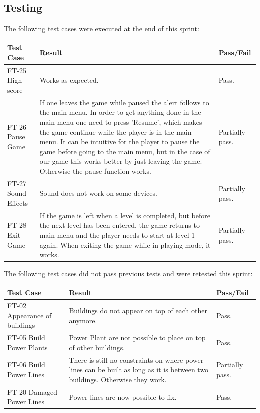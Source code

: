 \subsection{Testing}

	The following test cases were executed at the end of this sprint:


	\begin{tabular}{| p{3cm} | p{7cm} | p{2cm} |}
		\hline
		\rowcolor{lightgray}
		{\bf Test Case} & {\bf Result} & {\bf Pass/Fail} \\ \hline

		FT-25 High score & Works as expected. & Pass. \\ \hline

		FT-26 Pause Game & If one leaves the game while paused the alert follows to the main menu. In order 
		to get anything done in the main menu one need to press 'Resume', which makes the game continue while 
		the player is in the main menu. It can be intuitive for the player to pause the game before going to 
		the main menu, but in the case of our game this works better by just leaving the game. Otherwise the 
		pause function works. & Partially pass. \\ \hline

		FT-27 Sound Effects & Sound does not work on some devices. & Partially pass. \\ \hline

		FT-28 Exit Game & If the game is left when a level is completed, but before the next level has been 
		entered, the game returns to main menu and the player needs to start at level 1 again. When exiting 
		the game while in playing mode, it works. & Partially pass. \\ \hline



	\end{tabular}

	The following test cases did not pass previous tests and were retested this sprint:

	\begin{tabular}{| p{3cm} | p{7cm} | p{2cm} |}
		\hline
		\rowcolor{lightgray}
		{\bf Test Case} & {\bf Result} & {\bf Pass/Fail} \\ \hline
		
		FT-02 Appearance of buildings & Buildings do not appear on top of each other anymore. & Pass. \\ \hline
		
		FT-05 Build Power Plants & Power Plant are not possible to place on top of other buildings. & Pass. \\ \hline
		
		FT-06 Build Power Lines & There is still no constraints on where power lines can be built as long as it is between two buildings. Otherwise they work. & Partially pass. \\ \hline
		
		FT-20 Damaged Power Lines & Power lines are now possible to fix. & Pass. \\ \hline
	\end{tabular}

